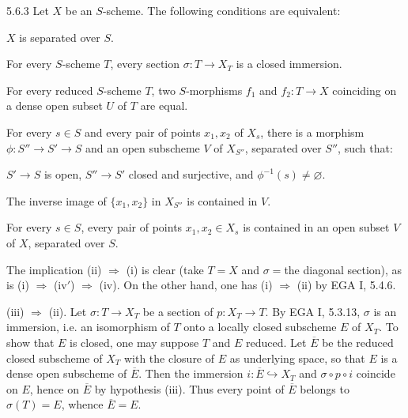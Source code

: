 \begin{lemma}{5.6.3}\label{VIB.5.6.3}
Let $X$ be an $S$-scheme. The following conditions are equivalent:
\begin{enumeratei}
\item $X$ is separated over $S$.
\item For every $S$-scheme $T$, every section $\sigma:T\to X_T$ is a closed immersion.
\item For every reduced $S$-scheme $T$, two $S$-morphisms $f_1$ and $f_2:T\to X$ coinciding on a dense open subset $U$ of $T$ are equal.
\item For every $s\in S$ and every pair of points $x_1,x_2$ of $X_s$, there is a morphism $\phi:S''\to S'\to S$ and an open subscheme $V$ of $X_{S''}$, separated over $S''$, such that:
\begin{enumeratea}
\item $S'\to S$ is open, $S''\to S'$ closed and surjective, and $\phi^{-1}(s)\ne\varnothing$.
\item The inverse image of $\{x_1,x_2\}$ in $X_{S''}$ is contained in $V$.
\end{enumeratea}
\item[(iv$'$)] For every $s\in S$, every pair of points $x_1,x_2\in X_s$ is contained in an open subset $V$ of $X$, separated over $S$.
\end{enumeratei}
\end{lemma}
The implication (ii) $\Rightarrow$ (i) is clear (take $T=X$ and $\sigma={}$the diagonal section), as is (i) $\Rightarrow$ (iv$'$) $\Rightarrow$ (iv). On the other hand, one has (i) $\Rightarrow$ (ii) by EGA I, 5.4.6.

(iii) $\Rightarrow$ (ii). Let $\sigma:T\to X_T$ be a section of $p:X_T\to T$. By EGA I, 5.3.13, $\sigma$ is an immersion, i.e. an isomorphism of $T$ onto a locally closed subscheme $E$ of $X_T$. To show that $E$ is closed, one may suppose $T$ and $E$ reduced. Let $\overline E$ be the reduced closed subscheme of $X_T$ with the closure of $E$ as underlying space, so that $E$ is a dense open subscheme of $\overline E$. Then the immersion $i:\overline E\hookrightarrow X_T$ and $\sigma\circ p\circ i$ coincide on $E$, hence on $\overline E$ by hypothesis (iii). Thus every point of $\overline E$ belongs to $\sigma(T)=E$, whence $\overline E=E$.

